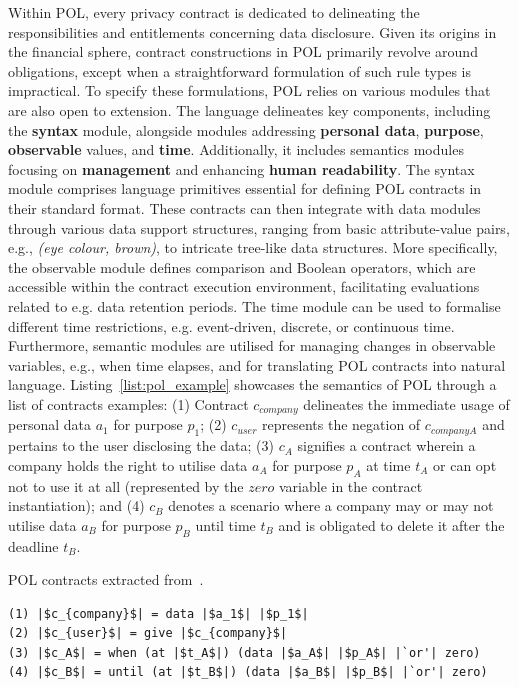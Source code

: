 Within POL, every privacy contract is dedicated to delineating the responsibilities and entitlements concerning data disclosure.
Given its origins in the financial sphere, contract constructions in POL primarily revolve around obligations, except when a straightforward formulation of such rule types is impractical.
To specify these formulations, POL relies on various modules that are also open to extension.
The language delineates key components, including the \textbf{syntax} module, alongside modules addressing \textbf{personal data}, \textbf{purpose}, \textbf{observable} values, and \textbf{time}.
Additionally, it includes semantics modules focusing on \textbf{management} and enhancing \textbf{human readability}.
The syntax module comprises language primitives essential for defining POL contracts in their standard format.
These contracts can then integrate with data modules through various data support structures, ranging from basic attribute-value pairs, e.g., \textit{(eye colour, brown)}, to intricate tree-like data structures.
More specifically, the observable module defines comparison and Boolean operators, which are accessible within the contract execution environment, facilitating evaluations related to e.g. data retention periods.
The time module can be used to formalise different time restrictions, e.g. event-driven, discrete, or continuous time.
Furthermore, semantic modules are utilised for managing changes in observable variables, e.g., when time elapses, and for translating POL contracts into natural language.
Listing~\ref{list:pol_example} showcases the semantics of POL through a list of contracts examples:
(1) Contract $c_{company}$ delineates the immediate usage of personal data $a_1$ for purpose $p_1$;
(2) $c_{user}$ represents the negation of $c_{companyA}$ and pertains to the user disclosing the data;
(3) $c_A$ signifies a contract wherein a company holds the right to utilise data $a_A$ for purpose $p_A$ at time $t_A$ or can opt not to use it at all (represented by the $zero$ variable in the contract instantiation); and
(4) $c_B$ denotes a scenario where a company may or may not utilise data $a_B$ for purpose $p_B$ until time $t_B$ and is obligated to delete it after the deadline $t_B$.

\begin{listing}[ht]
\caption{POL contracts extracted from~\cite{berthold_towards_2011}.}
\label{list:pol_example}
\begin{verbatim}
(1) |$c_{company}$| = data |$a_1$| |$p_1$|
(2) |$c_{user}$| = give |$c_{company}$|
(3) |$c_A$| = when (at |$t_A$|) (data |$a_A$| |$p_A$| |`or'| zero)
(4) |$c_B$| = until (at |$t_B$|) (data |$a_B$| |$p_B$| |`or'| zero) 
\end{verbatim}
\end{listing}

